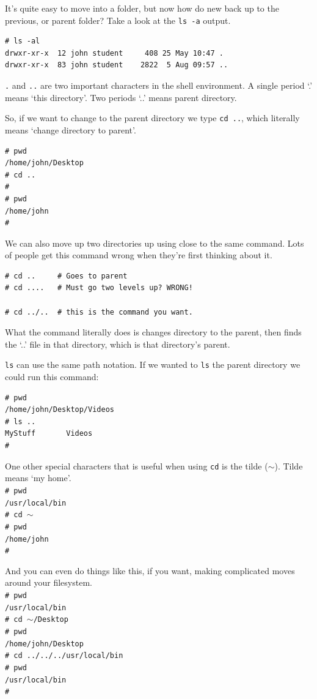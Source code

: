 It's quite easy to move into a folder, but now how do new back up to the 
previous, or parent folder? Take a look at the {\tt ls -a} output. 
{\tt \begin{verbatim}
# ls -al
drwxr-xr-x  12 john student     408 25 May 10:47 .
drwxr-xr-x  83 john student    2822  5 Aug 09:57 ..
\end{verbatim}
}

{\tt .} and {\tt ..} are two important characters in the shell environment.  A single period `.' means `this directory'. Two periods `..' means parent directory.

So, if we want to change to the parent directory we type {\tt cd ..}, which literally means `change directory to parent'.
{\tt \begin{verbatim}
# pwd
/home/john/Desktop
# cd ..
#
# pwd
/home/john
#
\end{verbatim}
}

We can also move up two directories up using close to the same command. Lots
 of people get this command wrong when they're first thinking about it.
{\tt \begin{verbatim}
# cd ..     # Goes to parent
# cd ....   # Must go two levels up? WRONG!

# cd ../..  # this is the command you want.
\end{verbatim}
}

What the command literally does is changes directory to the parent, 
then finds the `..' file in that directory, which is that directory's parent.

{\tt ls} can use the same path notation.  If we wanted to {\tt ls} the parent directory we 
could run this command:
{\tt \begin{verbatim}
# pwd
/home/john/Desktop/Videos
# ls ..
MyStuff       Videos        
#
\end{verbatim}
}

One other special characters that is useful when using {\tt cd} is the tilde ($\sim$). Tilde means `my home'.
{\tt \\    %
\# pwd \\
/usr/local/bin \\
\# cd $\sim$ \\
\# pwd \\
/home/john \\
\# \\

}
 
 
And you can even do things like this, if you want, making complicated moves
around your filesystem.
{\tt \\
\# pwd \\
/usr/local/bin \\
\# cd $\sim$/Desktop \\
\# pwd \\
/home/john/Desktop \\
\# cd ../../../usr/local/bin \\
\# pwd \\
/usr/local/bin \\
\# \\ 
}


